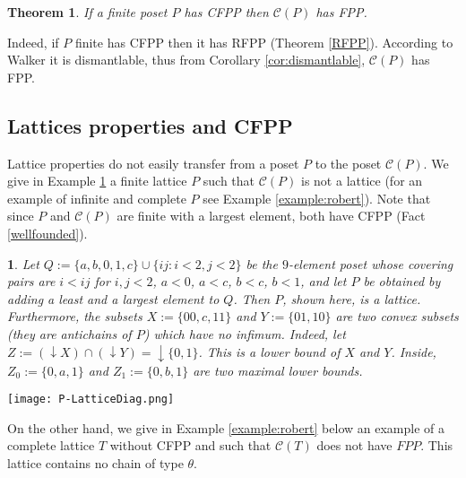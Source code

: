 \documentclass[12pt]{amsart}
\newtheorem{theorem}[definition]{{\bf Theorem}}
\newtheorem{example}[definition]{\noindent {\bf Example}}
\begin{document}
\begin{theorem}\label{thm:not FPP} 
If a finite poset  $P$ has CFPP then $\mathcal C (P)$ has FPP. 
\end{theorem}

Indeed, if $P$ finite has CFPP then it has RFPP (Theorem
\ref{RFPP}). According to Walker it is dismantlable, thus from
Corollary \ref{cor:dismantlable}, $\mathcal C (P)$ has FPP.

\subsection{Lattices properties and CFPP}
 
Lattice properties do not easily transfer from a poset $P$ to the
poset $\mathcal C(P)$. We give in Example \ref{example:lattice} a
finite lattice $P$ such that $\mathcal C (P)$ is not a lattice (for
an example of infinite and complete $P$ see Example
\ref{example:robert}). Note that since $P$ and $\mathcal C  (P)$
are finite with a largest element, both have CFPP (Fact
\ref{wellfounded}).

\noindent \begin{minipage}[t]{0.5\textwidth} 
\begin{example}\label {example:lattice} 
Let $Q:=\{a, b, 0, 1, c \}\cup \{ij: i<2,j<2\}$ be the $9$-element
poset whose covering pairs are $i<ij$ for $i,j<2$, $a<0$, $a<c$,
$b<c$, $b<1$, and let $P$  be obtained by adding a least and a
largest element to $Q$. Then $P$, shown here, is a lattice. Furthermore, the
subsets $X:= \{ 00, c, 11\}$ and $Y:= \{01, 10\}$ are two convex
subsets (they are antichains of $P$) which have no infimum. Indeed,
let $Z:= ({\downarrow \!\!} X)\cap ({\downarrow \!\!} Y)= {\downarrow \!\!}
\{0, 1\}$.  This is a lower bound of $X$ and $Y$. Inside, $Z_0:= \{0,
a, 1\}$ and $Z_1:=\{0,b, 1\}$ are two maximal lower bounds.
\end{example}
\end{minipage}
\hfill 
\begin{minipage}[t]{0.5\textwidth}
\vspace{1cm}
\begin{center}
\texttt{[image: P-LatticeDiag.png]}
\end{center}
\bigskip
\end{minipage}

\bigskip

On the other hand, we give in Example \ref{example:robert} below an
example of a complete lattice $T$ without CFPP and such that $\mathcal
C (T)$ does not have $FPP$.  This lattice contains no chain of type
$\theta$.
  
\end{document}
